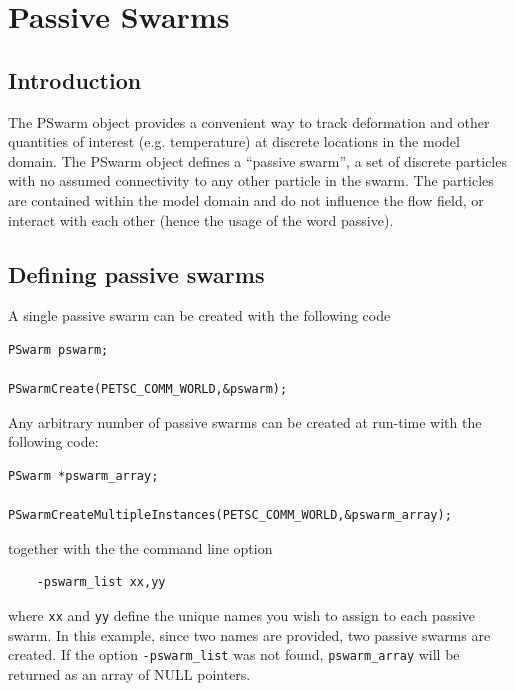 \documentclass[paper=a4, fontsize=10pt,twoside]{scrartcl}
\begin{document}
{{%

\section{Passive Swarms}
\subsection{Introduction}

The PSwarm object provides a convenient way to track deformation and other quantities of interest (e.g. temperature)
at discrete locations in the model domain. 
The PSwarm object defines a ``passive swarm'', a set of discrete particles with no assumed connectivity to
any other particle in the swarm. The particles are contained within the model domain and do not influence the flow field, 
or interact with each other (hence the usage of the word passive).

\subsection{Defining passive swarms} \label{sec:def_pswarm}
A single passive swarm can be created with the following code
\begin{lstlisting}
PSwarm pswarm;

PSwarmCreate(PETSC_COMM_WORLD,&pswarm);
\end{lstlisting}

Any arbitrary number of passive swarms can be created at run-time with the following code: 
\begin{lstlisting}
PSwarm *pswarm_array;

PSwarmCreateMultipleInstances(PETSC_COMM_WORLD,&pswarm_array);
\end{lstlisting}
together with the the command line option
\begin{lstlisting}
	-pswarm_list xx,yy
\end{lstlisting}	
where \texttt{xx} and \texttt{yy} define the unique names you wish to assign to each passive swarm.
In this example, since two names are provided, two passive swarms are created.
If the option \texttt{-pswarm\_list} was not found, \texttt{pswarm\_array} will be returned as an array of NULL pointers.

}}
\end{document}
